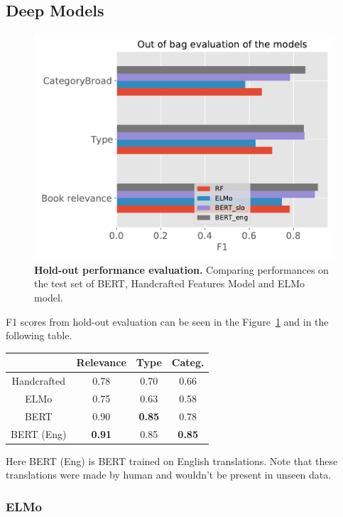 \documentclass[11pt,a4paper]{article}
\begin{document}
\subsection{Deep Models}
\begin{figure}[tbh]
    \centering
    \includegraphics[width = \linewidth]{../results/plot_deep_models.pdf}
    \caption{\textbf{Hold-out performance evaluation.} Comparing performances on the test set of BERT, Handcrafted Features Model and ELMo model.}
    \label{fig:h-o_eval}
\end{figure}

F1 scores from hold-out evaluation can be seen in the Figure~\ref{fig:h-o_eval} and in the following table.

\begin{center}
\begin{tabular}{ c|c c c }
     & Relevance & Type & Categ. \\ 
    \hline
    Handcrafted & 0.78 & 0.70 & 0.66 \\ 
    ELMo & 0.75 & 0.63 & 0.58 \\ 
    BERT & 0.90 & \textbf{0.85} & 0.78 \\ 
    BERT (Eng) & \textbf{0.91} & 0.85 & \textbf{0.85} \\ 
\end{tabular}
\end{center}

Here BERT (Eng) is BERT trained on English translations. Note that these translations were made by human and wouldn't be present in unseen data.

\subsubsection{ELMo}
\end{document}
